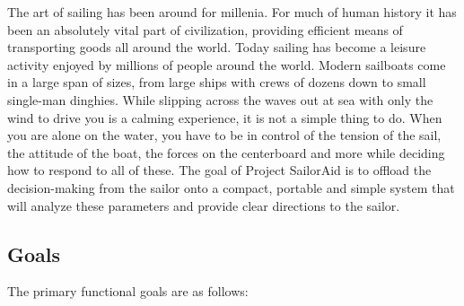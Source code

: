 
The art of sailing has been around for millenia. For much of human history it has been an absolutely vital part of civilization, providing efficient means of transporting goods all around the world. Today sailing has become a leisure activity enjoyed by millions of people around the world. Modern sailboats come in a large span of sizes, from large ships with crews of dozens down to small single-man dinghies. While slipping across the waves out at sea with only the wind to drive you is a calming experience, it is not a simple thing to do. When you are alone on the water, you have to be in control of the tension of the sail, the attitude of the boat, the forces on the centerboard and more while deciding how to respond to all of these. The goal of Project SailorAid is to offload the decision-making from the sailor onto a compact, portable and simple system that will analyze these parameters and provide clear directions to the sailor. 

\subsection{Goals}
The primary functional goals are as follows:

